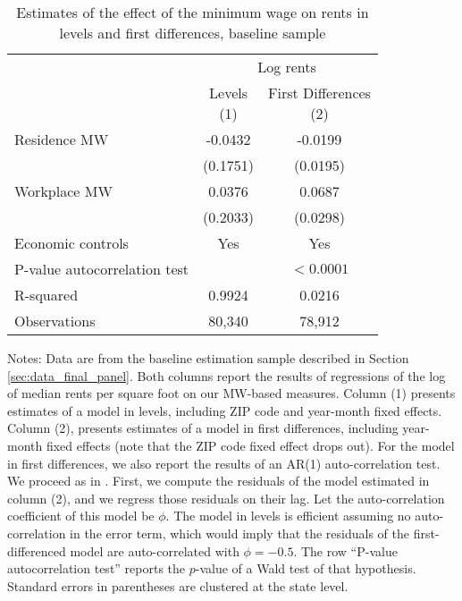 \begin{table}[hbt!] \centering
    \caption{Estimates of the effect of the minimum wage on rents in levels and first differences,
             baseline sample}
    \label{tab:autocorrelation}
    \begin{tabular}{@{}lcc@{}}
        \toprule
            & \multicolumn{2}{c}{Log rents}                            \\ \cmidrule(l){2-3}
            & \shortstack{Levels\\(1)} 
            & \shortstack{First Differences\\(2)}                      \\ \midrule
        Residence MW                      &  -0.0432   &  -0.0199              \\
                                          & (0.1751)  & (0.0195)             \\
        Workplace MW                      &  0.0376   &  0.0687              \\
                                          & (0.2033)  & (0.0298)             \\ \midrule
        Economic controls                 &  Yes   &  Yes              \\
        P-value autocorrelation test      &        &  $<0.0001$        \\
        R-squared                         &  0.9924   &  0.0216              \\
        Observations                      &  80,340  &  78,912             \\ \bottomrule
    \end{tabular}

    \begin{minipage}{.95\textwidth} \footnotesize
        \vspace{2mm}
        Notes:
        Data are from the baseline estimation sample described in Section 
        \ref{sec:data_final_panel}.
        Both columns report the results of regressions of the log of 
        median rents per square foot on our MW-based measures.
        Column (1) presents estimates of a model in levels, including 
        ZIP code and year-month fixed effects.
        Column (2), presents estimates of a model in first differences, 
        including year-month fixed effects 
        (note that the ZIP code fixed effect drops out).
        For the model in first differences, we also report the results of an 
        AR(1) auto-correlation test.
        We proceed as in \textcite[][Section 10.6.3]{wooldridge2010}.
        First, we compute the residuals of the model estimated in column (2), 
        and we regress those residuals on their lag.
        Let the auto-correlation coefficient of this model be $\phi$.
        The model in levels is efficient assuming no auto-correlation in the 
        error term, which would imply that the residuals of the 
        first-differenced model are auto-correlated with $\phi = -0.5$.
        The row ``P-value autocorrelation test'' reports the $p$-value of 
        a Wald test of that hypothesis.
        Standard errors in parentheses are clustered at the state level.
    \end{minipage}
\end{table}
